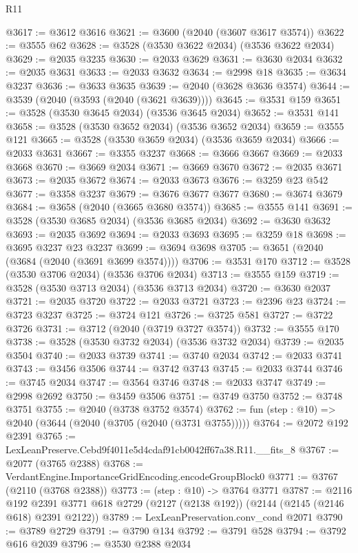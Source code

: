 \begin{lexlean}{R11}
\begin{coremodule}
@3617 := @3612 @3616
@3621 := @3600 (@2040 (@3607 @3617 @3574))
@3622 := @3555 @62
@3628 := @3528 (@3530 @3622 @2034) (@3536 @3622 @2034)
@3629 := @2035 @3235
@3630 := @2033 @3629
@3631 := @3630 @2034
@3632 := @2035 @3631
@3633 := @2033 @3632
@3634 := @2998 @18
@3635 := @3634 @3237
@3636 := @3633 @3635
@3639 := @2040 (@3628 @3636 @3574)
@3644 := @3539 (@2040 (@3593 (@2040 (@3621 @3639))))
@3645 := @3531 @159
@3651 := @3528 (@3530 @3645 @2034) (@3536 @3645 @2034)
@3652 := @3531 @141
@3658 := @3528 (@3530 @3652 @2034) (@3536 @3652 @2034)
@3659 := @3555 @121
@3665 := @3528 (@3530 @3659 @2034) (@3536 @3659 @2034)
@3666 := @2033 @3631
@3667 := @3355 @3237
@3668 := @3666 @3667
@3669 := @2033 @3668
@3670 := @3669 @2034
@3671 := @3669 @3670
@3672 := @2035 @3671
@3673 := @2035 @3672
@3674 := @2033 @3673
@3676 := @3259 @23 @542
@3677 := @3358 @3237
@3679 := @3676 @3677 @3677
@3680 := @3674 @3679
@3684 := @3658 (@2040 (@3665 @3680 @3574))
@3685 := @3555 @141
@3691 := @3528 (@3530 @3685 @2034) (@3536 @3685 @2034)
@3692 := @3630 @3632
@3693 := @2035 @3692
@3694 := @2033 @3693
@3695 := @3259 @18
@3698 := @3695 @3237 @23 @3237
@3699 := @3694 @3698
@3705 := @3651 (@2040 (@3684 (@2040 (@3691 @3699 @3574))))
@3706 := @3531 @170
@3712 := @3528 (@3530 @3706 @2034) (@3536 @3706 @2034)
@3713 := @3555 @159
@3719 := @3528 (@3530 @3713 @2034) (@3536 @3713 @2034)
@3720 := @3630 @2037
@3721 := @2035 @3720
@3722 := @2033 @3721
@3723 := @2396 @23
@3724 := @3723 @3237
@3725 := @3724 @121
@3726 := @3725 @581
@3727 := @3722 @3726
@3731 := @3712 (@2040 (@3719 @3727 @3574))
@3732 := @3555 @170
@3738 := @3528 (@3530 @3732 @2034) (@3536 @3732 @2034)
@3739 := @2035 @3504
@3740 := @2033 @3739
@3741 := @3740 @2034
@3742 := @2033 @3741
@3743 := @3456 @3506
@3744 := @3742 @3743
@3745 := @2033 @3744
@3746 := @3745 @2034
@3747 := @3564 @3746
@3748 := @2033 @3747
@3749 := @2998 @2692
@3750 := @3459 @3506
@3751 := @3749 @3750
@3752 := @3748 @3751
@3755 := @2040 (@3738 @3752 @3574)
@3762 := fun (step : @10) => @2040 (@3644 (@2040 (@3705 (@2040 (@3731 @3755)))))
@3764 := @2072 @192 @2391
@3765 := LexLeanPreserve.Cebd9f4011e5d4cdaf91cb0042ff67a38.R11.__fits_8
@3767 := @2077 (@3765 @2388)
@3768 := VerdantEngine.ImportanceGridEncoding.encodeGroupBlock0
@3771 := @3767 (@2110 (@3768 @2388))
@3773 := (step : @10) -> @3764 @3771
@3787 := @2116
    @192
    @2391
    @3771
    @618
    @2729
    (@2127 (@2138 @192))
    (@2144 (@2145 (@2146 @618) @2391 @2122))
@3789 := LexLeanPreservation.conv_cond @2071
@3790 := @3789 @2729
@3791 := @3790 @134
@3792 := @3791 @528
@3794 := @3792 @616 @2039
@3796 := @3530 @2388 @2034

\end{coremodule}
\end{lexlean}
